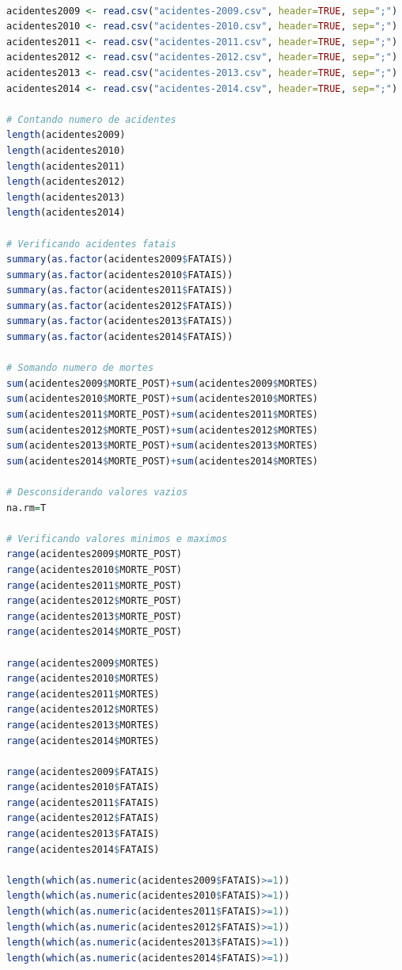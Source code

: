 \documentclass[11pt,article,oneside,a4paper]{abntex2}
\begin{document}
\begin{small}
\begin{lstlisting}[language=R,frame=shadowbox, breaklines=true, commentstyle=\textit]

acidentes2009 <- read.csv("acidentes-2009.csv", header=TRUE, sep=";")
acidentes2010 <- read.csv("acidentes-2010.csv", header=TRUE, sep=";")
acidentes2011 <- read.csv("acidentes-2011.csv", header=TRUE, sep=";")
acidentes2012 <- read.csv("acidentes-2012.csv", header=TRUE, sep=";")
acidentes2013 <- read.csv("acidentes-2013.csv", header=TRUE, sep=";")
acidentes2014 <- read.csv("acidentes-2014.csv", header=TRUE, sep=";")

# Contando numero de acidentes
length(acidentes2009)
length(acidentes2010)
length(acidentes2011)
length(acidentes2012)
length(acidentes2013)
length(acidentes2014)

# Verificando acidentes fatais
summary(as.factor(acidentes2009$FATAIS))
summary(as.factor(acidentes2010$FATAIS))
summary(as.factor(acidentes2011$FATAIS))
summary(as.factor(acidentes2012$FATAIS))
summary(as.factor(acidentes2013$FATAIS))
summary(as.factor(acidentes2014$FATAIS))

# Somando numero de mortes
sum(acidentes2009$MORTE_POST)+sum(acidentes2009$MORTES)
sum(acidentes2010$MORTE_POST)+sum(acidentes2010$MORTES)
sum(acidentes2011$MORTE_POST)+sum(acidentes2011$MORTES)
sum(acidentes2012$MORTE_POST)+sum(acidentes2012$MORTES)
sum(acidentes2013$MORTE_POST)+sum(acidentes2013$MORTES)
sum(acidentes2014$MORTE_POST)+sum(acidentes2014$MORTES)

# Desconsiderando valores vazios
na.rm=T

# Verificando valores minimos e maximos
range(acidentes2009$MORTE_POST)
range(acidentes2010$MORTE_POST)
range(acidentes2011$MORTE_POST)
range(acidentes2012$MORTE_POST)
range(acidentes2013$MORTE_POST)
range(acidentes2014$MORTE_POST)

range(acidentes2009$MORTES)
range(acidentes2010$MORTES)
range(acidentes2011$MORTES)
range(acidentes2012$MORTES)
range(acidentes2013$MORTES)
range(acidentes2014$MORTES)

range(acidentes2009$FATAIS)
range(acidentes2010$FATAIS)
range(acidentes2011$FATAIS)
range(acidentes2012$FATAIS)
range(acidentes2013$FATAIS)
range(acidentes2014$FATAIS)

length(which(as.numeric(acidentes2009$FATAIS)>=1))
length(which(as.numeric(acidentes2010$FATAIS)>=1))
length(which(as.numeric(acidentes2011$FATAIS)>=1))
length(which(as.numeric(acidentes2012$FATAIS)>=1))
length(which(as.numeric(acidentes2013$FATAIS)>=1))
length(which(as.numeric(acidentes2014$FATAIS)>=1))


\end{lstlisting}
\end{small}
\end{document}
